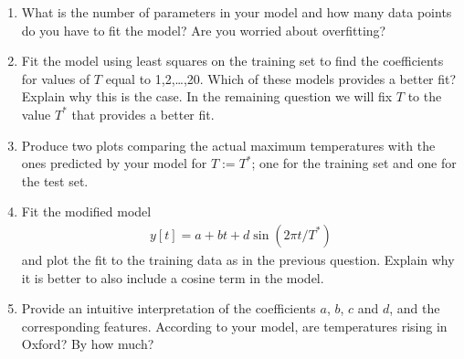 \documentclass[12pt,twoside]{article}
\begin{document}
\begin{enumerate}
  \begin{enumerate}
  \item What is the number of parameters in your model and how many data points do you have to fit the model? Are you worried about overfitting?
  \item Fit the model using least squares on the training set to
    find the coefficients for values of $T$ equal to 1,2,\ldots,20. Which of these models provides a better fit? Explain why this is the case. In the remaining question we will fix $T$ to the value $T^{\ast}$ that provides a better fit.
  \item Produce two plots comparing the actual maximum temperatures with
    the ones predicted by your model for $T:=T^{\ast}$; one for the training set and one for the test set. 
 \item Fit the modified model  
   \begin{align}
  y[t] = a + bt + d \sin(2\pi t/T^{\ast})
  \end{align}
and plot the fit to the training data as in the previous question. Explain why it is better to also include a cosine term in the model.
   \item Provide an intuitive interpretation of the coefficients $a$, $b$, $c$ and $d$, and the corresponding features. According to your model, are temperatures rising in Oxford? By how much?
  \end{enumerate}
   

\end{enumerate}
\end{document}
